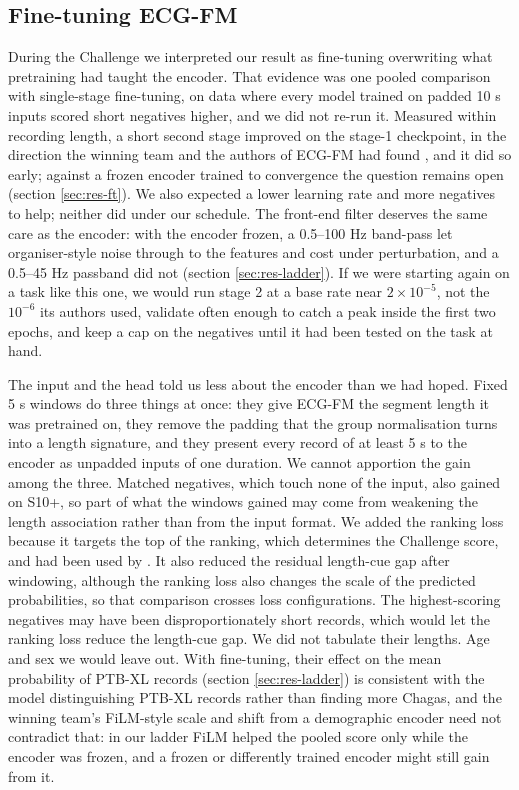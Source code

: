 \documentclass{iopjournal}
\begin{document}
\subsection{Fine-tuning ECG-FM}
During the Challenge we interpreted our result as fine-tuning overwriting what pretraining had taught the encoder. That evidence was one pooled comparison with single-stage fine-tuning, on data where every model trained on padded 10 s inputs scored short negatives higher, and we did not re-run it. Measured within recording length, a short second stage improved on the stage-1 checkpoint, in the direction the winning team and the authors of ECG-FM had found \citep{vansantvliet2025,mckeen2025}, and it did so early; against a frozen encoder trained to convergence the question remains open (section \ref{sec:res-ft}). We also expected a lower learning rate and more negatives to help; neither did under our schedule. The front-end filter deserves the same care as the encoder: with the encoder frozen, a 0.5--100 Hz band-pass let organiser-style noise through to the features and cost \FiltRowOneCminusA{} under perturbation, and a 0.5--45 Hz passband did not (section \ref{sec:res-ladder}). If we were starting again on a task like this one, we would run stage 2 at a base rate near $2\times10^{-5}$, not the $10^{-6}$ its authors used, validate often enough to catch a peak inside the first two epochs, and keep a cap on the negatives until it had been tested on the task at hand.

The input and the head told us less about the encoder than we had hoped. Fixed 5 s windows do three things at once: they give ECG-FM the segment length it was pretrained on, they remove the padding that the group normalisation turns into a length signature, and they present every record of at least 5 s to the encoder as unpadded inputs of one duration. We cannot apportion the gain among the three. Matched negatives, which touch none of the input, also gained on S10+, so part of what the windows gained may come from weakening the length association rather than from the input format. We added the ranking loss because it targets the top of the ranking, which determines the Challenge score, and had been used by \citet{hong2025}. It also reduced the residual length-cue gap after windowing, although the ranking loss also changes the scale of the predicted probabilities, so that comparison crosses loss configurations. The highest-scoring negatives may have been disproportionately short records, which would let the ranking loss reduce the length-cue gap. We did not tabulate their lengths. Age and sex we would leave out. With fine-tuning, their effect on the mean probability of PTB-XL records (section \ref{sec:res-ladder}) is consistent with the model distinguishing PTB-XL records rather than finding more Chagas, and the winning team's FiLM-style scale and shift from a demographic encoder \citep{vansantvliet2025} need not contradict that: in our ladder FiLM helped the pooled score only while the encoder was frozen, and a frozen or differently trained encoder might still gain from it.
\end{document}
